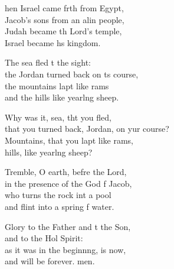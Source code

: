 \settowidth{\versewidth}{that you turned back, Jordan, on your course?}
\begin{psalmverse}%
  \begin{patverse}
hen Israel came frth from Egypt,\Med\\
Jacob’s sons from an alin people,\\
Judah became th Lord’s temple,\Med\\
Israel became h\pointup{\i}s kingdom.

The sea fled t the sight:\Med\\
the Jordan turned back on \pointup{\i}ts course,\\
the mountains lapt like rams\Med\\
and the hills like yearl\pointup{\i}ng sheep.

Why was it, sea, tht you fled,\Med\\
that you turned back, Jordan, on yur course?\\
Mountains, that you lapt like rams,\Med\\
hills, like yearl\pointup{\i}ng sheep?

Tremble, O earth, befre the Lord,\Med\\
in the presence of the God f Jacob,\\
who turns the rock int a pool\Med\\
and flint into a spring f water.

Glory to the Father and t the Son,\Med\\
and to the Hol Spirit:\\
as it was in the beginn\pointup{\i}ng, is now,\Med\\
and will be forever. men.
  \end{patverse}
\end{psalmverse}

